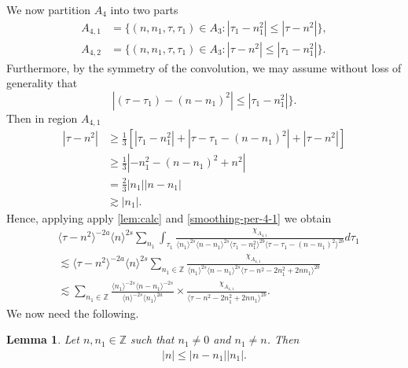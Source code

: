 \documentclass[12pt,reqno]{amsart}
\numberwithin{equation}{section}  %
\newcommand{\zz}{\mathbb{Z}}
\newtheorem{lemma}[theorem]{Lemma}
\begin{document}
%
%
We now 
partition $ A_{4}$ into two parts
\begin{align*}
A_{4,1}&=\{(n, n_1, \tau, \tau_1)\in A_3: |\tau_1-n_1^2|\leq|\tau-n^2|\},\\
A_{4,2}&=\{(n, n_1, \tau, \tau_1)\in A_3: |\tau-n^2|\leq|\tau_1-n_1^2| \}.
\end{align*} 
Furthermore, by the symmetry of the convolution, we may assume without loss of
generality that
$$|(\tau-\tau_1)-(n-n_1)^2|\leq|\tau_1-n_1^2|\}.$$
Then in region $A_{4,1}$
\begin{equation}
\begin{split}
  | \tau - n^{2} |
  & \ge \frac{1}{3}\left[ | \tau_{1} - n_{1}^{2} | + | \tau -
  \tau_{1} - (n - n_{1})^{2}
  | + | \tau - n^{2} | \right]
  \\
  & \ge \frac{1}{3} | - n_{1}^{2} - (n - n_{1})^{2} + n^{2} |
  \\
  & = \frac{2}{3} | n_{1} | | n - n_{1} |
  \\
  & \gtrsim | n_{1} |. 
\end{split}
\label{smoothing-per-4-1}
\end{equation}
%
%
Hence, applying apply \cref{lem:calc} and \eqref{smoothing-per-4-1}
we obtain
%
%
%
%
\begin{equation}
  \label{region-a41}
\begin{split}
& \langle \tau - n^{2}  \rangle ^{-2a} \langle n
    \rangle ^{2s}
    \sum_{n_{1}} \int_{\tau_{1}} \frac{\chi_{A_{4,1}}}{ \langle n_{1} \rangle ^{2s} \langle n-n_{1} \rangle ^{2s} 
\langle \tau_{1} - n_{1}^{2}  \rangle^{2b} \langle  \tau - \tau_{1} - (n -
n_{1})^{2}  \rangle^{2b}}
d \tau_1 
\\
& \lesssim \langle \tau - n^{2} \rangle ^{-2a} \langle n \rangle ^{2s}
\sum_{n_{1} \in
\zz}  \frac{\chi_{A_{4,1}}}{\langle n_{1} \rangle ^{2s} \langle n - n_{1} \rangle
^{2s} \langle \tau - n^{2} - 2n_{1}^{2} + 2nn_{1}  \rangle^{2b} }
\\
& \lesssim 
\sum_{n_{1} \in
\zz}  \frac{\langle n_1 \rangle ^{-2s} \langle n - n_{1} \rangle ^{-2s}}{\langle
n \rangle ^{-2s} \langle n_{1} \rangle
^{2a}} \times \frac{\chi_{A_{4,1}}}{\langle \tau - n^{2} - 2n_{1}^{2} + 2nn_{1}
\rangle^{2b} }.
\end{split}
\end{equation}
%
%
We now need the following. 
%
%
%
%
%
%
%
%
\begin{lemma}
  Let $n, n_1 \in \zz$ such that $n_{1} \neq 0$ and $n_{1} \neq n$.
  Then
  \begin{equation*}
  \begin{split}
    | n | \le | n - n_{1} | | n_{1} |.
  \end{split}
  \end{equation*}
\label{lem:integer-bound}
\end{lemma}
\end{document}
